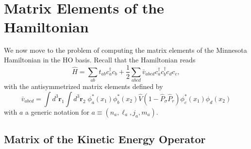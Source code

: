 \documentclass[letterpaper,12pt]{article}
\newcommand{\gras}[1]{\boldsymbol{#1}}
\begin{document}

\section{Matrix Elements of the Hamiltonian}

We now move to the problem of computing the matrix elements of the Minnesota 
Hamiltonian in the HO basis. Recall that the Hamiltonian reads
\begin{equation}
\hat{H} 
= 
\sum_{ab} t_{ab} c_{a}^{\dagger}c_{b} 
+ 
\frac{1}{2}\sum_{abcd}\bar{v}_{abcd} c_{a}^{\dagger}c_{b}^{\dagger}c_{d}c_{c},
\end{equation}
with the antisymmetrized matrix elements defined by
\begin{equation}
\bar{v}_{abcd} 
= 
\int d^{3}\gras{r}_{1}\int d^{3}\gras{r}_{2}\;
\phi_{a}^{*}(x_{1})\phi_{b}^{*}(x_{2})
\hat{V}\left( 1 - \hat{P}_{\sigma}\hat{P}_{r} \right)
\phi_{c}^{*}(x_{1})\phi_{d}(x_{2})
\end{equation}
with $a$ a generic notation for $a \equiv (n_{a},\ell_{a}, j_{a}, m_{a})$.


\subsection{Matrix of the Kinetic Energy Operator}
\end{document}
